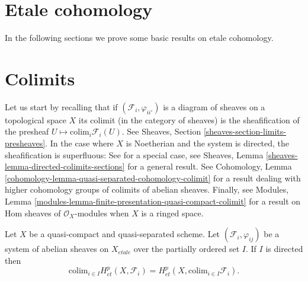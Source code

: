 \section{Etale cohomology}
\label{section-etale-cohomology}

\noindent
In the following sections we prove some basic results on etale cohomology.


\section{Colimits}
\label{section-colimit}

\noindent
Let us start by recalling that if $(\mathcal{F}_i, \varphi_{ii'})$
is a diagram of sheaves on a topological space $X$ its colimit (in the
category of sheaves) is the sheafification of the presheaf
$U \mapsto \text{colim}_i \mathcal{F}_i(U)$. See
Sheaves, Section \ref{sheaves-section-limits-presheaves}.
In the case where $X$ is Noetherian and the system is directed,
the sheafification is superfluous:
See \cite[Chapter II, Exercise 1.11]{H} for a special case, see
Sheaves, Lemma \ref{sheaves-lemma-directed-colimits-sections}
for a general result. See
Cohomology, Lemma \ref{cohomology-lemma-quasi-separated-cohomology-colimit}
for a result dealing with higher cohomology groups of colimits
of abelian sheaves. Finally, see
Modules, Lemma \ref{modules-lemma-finite-presentation-quasi-compact-colimit}
for a result on Hom sheaves of $\mathcal{O}_X$-modules when $X$
is a ringed space.

\begin{theorem}
\label{theorem-colimit}
Let $X$ be a quasi-compact and quasi-separated scheme. Let
$\left(\mathcal{F}_i, \varphi_{ij}\right)$ be a system of abelian sheaves on
$X_{etale}$ over the partially ordered set $I$. If $I$ is directed then
$$
\text{colim}_{i\in I} H_{et}^p(X, \mathcal{F}_i) = H_{et}^p(X,
\text{colim}_{i\in I} \mathcal{F}_i).
$$
\end{theorem}

